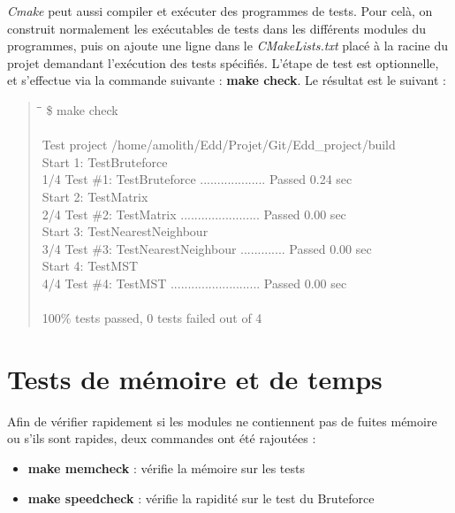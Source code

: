\textit{Cmake} peut aussi compiler et exécuter des programmes de tests. Pour celà, on construit normalement les exécutables de tests dans les différents modules du programmes, puis on ajoute une ligne dans le \textit{CMakeLists.txt} placé à la racine du projet demandant l'exécution des tests spécifiés. 
L'étape de test est optionnelle, et s'effectue via la commande suivante : \textbf{make check}.
Le résultat est le suivant :
\begin{quotation}

\begin{tabbing}
\hspace{2cm}\=\hspace{2cm}\=\kill
\$ make check\\
 \\
Test project /home/amolith/Edd/Projet/Git/Edd\_project/build\\
\> Start 1: TestBruteforce\\
1/4 Test \#1: TestBruteforce ...................   Passed    0.24 sec\\
\> Start 2: TestMatrix\\
2/4 Test \#2: TestMatrix .......................   Passed    0.00 sec\\
\> Start 3: TestNearestNeighbour\\
3/4 Test \#3: TestNearestNeighbour .............   Passed    0.00 sec\\
\> Start 4: TestMST\\
4/4 Test \#4: TestMST ..........................   Passed    0.00 sec\\
 \\
100\% tests passed, 0 tests failed out of 4
\end{tabbing}

\end{quotation}

\section{Tests de mémoire et de temps}

Afin de vérifier rapidement si les modules ne contiennent pas de fuites mémoire ou s'ils sont rapides, deux commandes ont été rajoutées :
\begin{itemize}
	\item \textbf{make memcheck} : vérifie la mémoire sur les tests
	\item \textbf{make speedcheck} : vérifie la rapidité sur le test du Bruteforce
\end{itemize}
